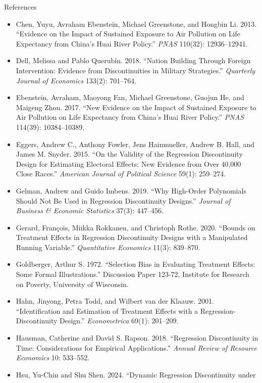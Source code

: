 \documentclass[aspectratio=169,11pt,xcolor=dvipsnames]{beamer}
\begin{document}
\begin{frame}[allowframebreaks,t]{References}
\begin{itemize}
Discontinuity Design: Lessons from Close U.S. House Races, 1942--2008.''
\textit{Political Analysis} 19(4): 385--408.
\item Chen, Yuyu, Avraham Ebenstein, Michael Greenstone, and Hongbin Li. 2013. ``Evidence
on the Impact of Sustained Exposure to Air Pollution on Life Expectancy from China's Huai
River Policy.'' \textit{PNAS} 110(32): 12936--12941.
\item Dell, Melissa and Pablo Querub\'in. 2018. ``Nation Building Through Foreign
Intervention: Evidence from Discontinuities in Military Strategies.''
\textit{Quarterly Journal of Economics} 133(2): 701--764.
\item Ebenstein, Avraham, Maoyong Fan, Michael Greenstone, Guojun He, and Maigeng Zhou.
2017. ``New Evidence on the Impact of Sustained Exposure to Air Pollution on Life
Expectancy from China's Huai River Policy.'' \textit{PNAS} 114(39): 10384--10389.
\item Eggers, Andrew C., Anthony Fowler, Jens Hainmueller, Andrew B. Hall, and
James M. Snyder. 2015. ``On the Validity of the Regression Discontinuity Design
for Estimating Electoral Effects: New Evidence from Over 40,000 Close Races.''
\textit{American Journal of Political Science} 59(1): 259--274.
\item Gelman, Andrew and Guido Imbens. 2019. ``Why High-Order Polynomials Should
Not Be Used in Regression Discontinuity Designs.'' \textit{Journal of Business \&
Economic Statistics} 37(3): 447--456.
\item Gerard, François, Miikka Rokkanen, and Christoph Rothe. 2020. ``Bounds on
Treatment Effects in Regression Discontinuity Designs with a Manipulated Running
Variable.'' \textit{Quantitative Economics} 11(3): 839--870.
\item Goldberger, Arthur S. 1972. ``Selection Bias in Evaluating Treatment
Effects: Some Formal Illustrations.'' Discussion Paper 123-72, Institute for
Research on Poverty, University of Wisconsin.
\item Hahn, Jinyong, Petra Todd, and Wilbert van der Klaauw. 2001.
``Identification and Estimation of Treatment Effects with a
Regression-Discontinuity Design.'' \textit{Econometrica} 69(1): 201--209.
\item Hausman, Catherine and David S. Rapson. 2018. ``Regression Discontinuity in
Time: Considerations for Empirical Applications.'' \textit{Annual Review of
Resource Economics} 10: 533--552.
\item Hsu, Yu-Chin and Shu Shen. 2024. ``Dynamic Regression Discontinuity under

\end{itemize}
\end{frame}
\end{document}

